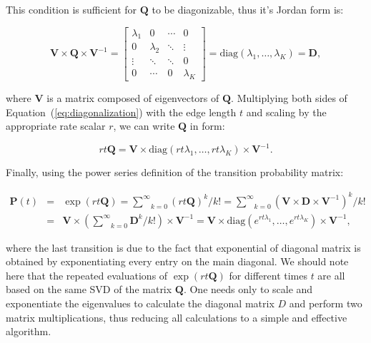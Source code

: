 \noindent
This condition is sufficient for $\mathbf{Q}$ to be diagonizable, thus it's Jordan form is:

\begin{equation}
\mathbf{V}\times\mathbf{Q}\times\mathbf{V}^{-1}=\left[\begin{array}{cccc}
\lambda_{1} & 0 & \cdots & 0\\
0 & \lambda_{2} & \ddots & \vdots\\
\vdots & \ddots & \ddots & 0\\
0 & \cdots & 0 & \lambda_{K}
\end{array}\right]=\text{diag}(\lambda_{1},\ldots,\lambda_{K})=\mathbf{D} ,
\label{eq:diagonalization}
\end{equation}

\noindent where $\mathbf{V}$ is a matrix composed of eigenvectors of $\mathbf{Q}$. 
Multiplying both sides of Equation~(\ref{eq:diagonalization}) with the edge length $t$ and scaling by the appropriate rate scalar $r$, we can write $\mathbf{Q}$ in form:

\begin{equation}
rt\mathbf{Q}=\mathbf{V}\times\text{diag}(rt\lambda_{1},\ldots,rt\lambda_{K})\times\mathbf{V}^{-1} .
\end{equation}

\noindent Finally, using the power series definition of the transition probability matrix: 

\begin{eqnarray}
\mathbf{P}(t) & = & \exp\left(rt\mathbf{Q}\right)  =  \underset{k=0}{\overset{\infty}{\sum}}\left(rt\mathbf{Q}\right)^{k}/k! 
 =  \underset{k=0}{\overset{\infty}{\sum}}\left(\mathbf{V}\times\mathbf{D}\times\mathbf{V}^{-1}\right)^{k}/k! \\ \nonumber
& = & \mathbf{V}\times\left(\underset{k=0}{\overset{\infty}{\sum}}\mathbf{D}^{k}/k!\right)\times\mathbf{V}^{-1} = \mathbf{V}\times\text{diag}(e^{rt\lambda_{1}},\ldots,e^{rt\lambda_{K}})\times\mathbf{V}^{-1} ,
\label{eq:eigen_decomposition}
\end{eqnarray}

\noindent 
where the last transition is due to the fact that exponential of diagonal matrix is obtained by exponentiating every entry on the main diagonal.
We should note here that the repeated evaluations of $\exp\left(rt\mathbf{Q}\right)$ for different times $t$ are all based on the same SVD of the matrix $\mathbf{Q}$. 
One needs only to scale and exponentiate the eigenvalues to calculate the diagonal matrix $D$ and perform two matrix multiplications, thus reducing all calculations to a simple and effective algorithm. 

